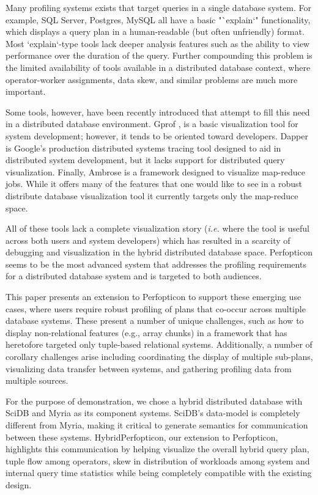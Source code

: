 \documentclass{chi2009}
\newcommand{\ie}{{\em i.e.} }
\begin{document}
Many profiling systems exists that target queries in a single database system. For example, SQL Server, Postgres, MySQL all have a basic "`explain`" functionality, which displays a query plan in a human-readable (but often unfriendly) format.  Most `explain`-type tools lack deeper analysis features such as the ability to view performance over the duration of the query.  Further compounding this problem is the limited availability of tools available in a distributed database context, where operator-worker assignments, data skew, and similar problems are much more important.

Some tools, however, have been recently introduced that attempt to fill this need in a distributed database environment. Gprof \cite{gprof}, is a basic visualization tool for system development; however, it tends to be oriented toward developers.  Dapper \cite{dapper} is Google’s production distributed systems tracing tool designed to aid in distributed system development, but it lacks support for distributed query visualization.  Finally, Ambrose \cite{ambrose} is a framework designed to visualize map-reduce jobs.  While it offers many of the features that one would like to see in a robust distribute database visualization tool it currently targets only the map-reduce space.  

All of these tools lack a complete visualization story (\ie where the tool is useful across both users and system developers) which has resulted in a scarcity of debugging and visualization in the hybrid distributed database space. Perfopticon \cite{perfopticon} seems to be the most advanced system that addresses the profiling requirements for a distributed database system and is targeted to both audiences.

This paper presents an extension to Perfopticon to support these emerging use cases, where users require robust profiling of plans that co-occur across multiple database systems.  These present a number of unique challenges, such as how to display non-relational features (e.g., array chunks) in a framework that has heretofore targeted only tuple-based relational systems.  Additionally, a number of corollary challenges arise including coordinating the display of multiple sub-plans, visualizing data transfer between systems, and gathering profiling data from multiple sources.

For the purpose of demonstration, we chose a hybrid distributed database with SciDB \cite{scidb} and Myria \cite{Myria} as its component systems. SciDB's data-model is completely different from Myria, making it critical to generate semantics for communication between these systems. HybridPerfopticon, our extension to Perfopticon, highlights this communication by helping visualize the overall hybrid query plan, tuple flow among operators, skew in distribution of workloads among system and internal query time statistics while being completely compatible with the existing design.
\end{document}
